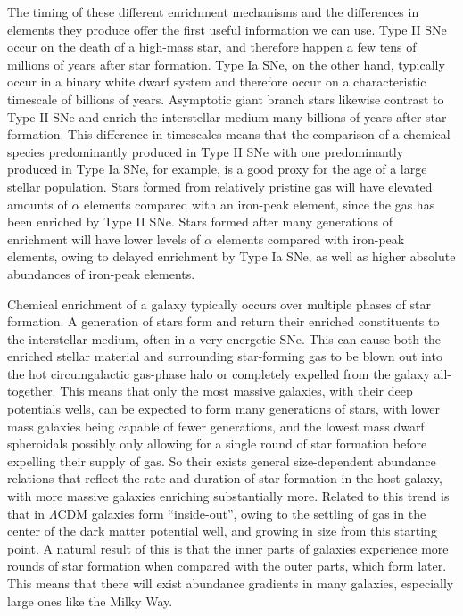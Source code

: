 The timing of these different enrichment mechanisms and the differences in elements they produce offer the first useful information we can use. Type II SNe occur on the death of a high-mass star, and therefore happen a few tens of millions of years after star formation. Type Ia SNe, on the other hand, typically occur in a binary white dwarf system and therefore occur on a characteristic timescale of billions of years. Asymptotic giant branch stars likewise contrast to Type II SNe and enrich the interstellar medium many billions of years after star formation. This difference in timescales means that the comparison of a chemical species predominantly produced in Type II SNe with one predominantly produced in Type Ia SNe, for example, is a good proxy for the age of a large stellar population. Stars formed from relatively pristine gas will have elevated amounts of $\alpha$ elements compared with an iron-peak element, since the gas has been enriched by Type II SNe. Stars formed after many generations of enrichment will have lower levels of $\alpha$ elements compared with iron-peak elements, owing to delayed enrichment by Type Ia SNe, as well as higher absolute abundances of iron-peak elements.

Chemical enrichment of a galaxy typically occurs over multiple phases of star formation. A generation of stars form and return their enriched constituents to the interstellar medium, often in a very energetic SNe. This can cause both the enriched stellar material and surrounding star-forming gas to be blown out into the hot circumgalactic gas-phase halo or completely expelled from the galaxy all-together. This means that only the most massive galaxies, with their deep potentials wells, can be expected to form many generations of stars, with lower mass galaxies being capable of fewer generations, and the lowest mass dwarf spheroidals possibly only allowing for a single round of star formation before expelling their supply of gas. So their exists general size-dependent abundance relations that reflect the rate and duration of star formation in the host galaxy, with more massive galaxies enriching substantially more. Related to this trend is that in $\Lambda$CDM galaxies form ``inside-out'', owing to the settling of gas in the center of the dark matter potential well, and growing in size from this starting point. A natural result of this is that the inner parts of galaxies experience more rounds of star formation when compared with the outer parts, which form later. This means that there will exist abundance gradients in many galaxies, especially large ones like the Milky Way.

